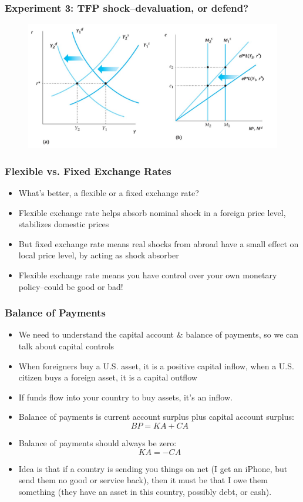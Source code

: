 \documentclass{beamer}
\begin{document}
\begin{frame}
\frametitle[alignment=center]{Experiment 3:  TFP shock--devaluation, or defend?}
\begin{figure}
\centering
\includegraphics[scale=0.5]{Figures/W_Fig_17pt10.png}
\end{figure}
\end{frame}


\begin{frame}
\frametitle[alignment=center]{ Flexible vs. Fixed Exchange Rates}
\begin{itemize}
\item What's better, a flexible or a fixed exchange rate?
\bigskip
\item Flexible exchange rate helps absorb nominal shock in a foreign price level, stabilizes domestic prices
\bigskip
\item But fixed exchange rate means real shocks from abroad have a small effect on local price level, by acting as shock absorber
\bigskip
\item Flexible exchange rate means you have control over your own monetary policy--could be good or bad!
\end{itemize}
\end{frame}

\begin{frame}
\frametitle[alignment=center]{ Balance of Payments}
\begin{itemize}
\item We need to understand the capital account \& balance of payments, so we can talk about capital controls
\bigskip
\item When foreigners buy a U.S. asset, it is a positive capital inflow, when a U.S. citizen buys a foreign asset, it is a capital outflow
\bigskip
\item If funds flow into your country to buy assets, it's an inflow.
\bigskip
\item Balance of payments is current account surplus plus capital account surplus:
$$BP=KA+CA$$
\item Balance of payments should always be zero:
$$KA=-CA$$
\item Idea is that if a country is sending you things on net (I get an iPhone, but send them no good or service back), then it must be that I owe them something (they have an asset in this country, possibly debt, or cash).  
\end{itemize}
\end{frame}
\end{document}
